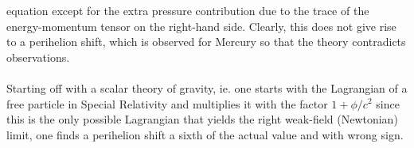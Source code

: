 equation except for the extra pressure contribution due to the trace of the energy-momentum
tensor on the right-hand side. Clearly, this does not give rise to a perihelion shift, which is
observed for Mercury so that the theory contradicts observations.
\\
\\
Starting off with a scalar theory of gravity, ie. one starts with the Lagrangian of a free particle in Special Relativity and multiplies it with the
factor $1 + \phi/c^2$ since this is the only possible Lagrangian that yields the right weak-field (Newtonian)
limit, one finds a perihelion shift a sixth of the actual value and with wrong sign.










